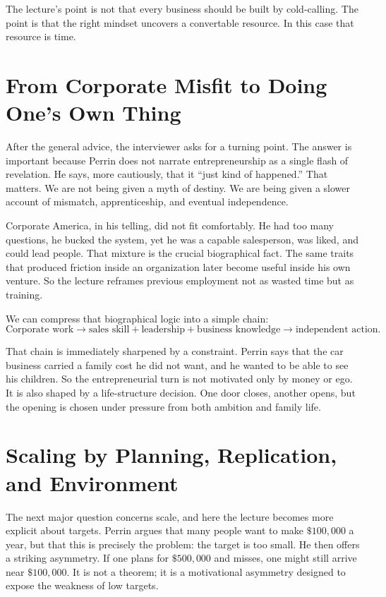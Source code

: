 The lecture's point is not that every business should be built by cold-calling. The point is that the right mindset uncovers a convertable resource. In this case that resource is time.

\section{From Corporate Misfit to Doing One's Own Thing}

After the general advice, the interviewer asks for a turning point. The answer is important because Perrin does not narrate entrepreneurship as a single flash of revelation. He says, more cautiously, that it ``just kind of happened.'' That matters. We are not being given a myth of destiny. We are being given a slower account of mismatch, apprenticeship, and eventual independence.

Corporate America, in his telling, did not fit comfortably. He had too many questions, he bucked the system, yet he was a capable salesperson, was liked, and could lead people. That mixture is the crucial biographical fact. The same traits that produced friction inside an organization later become useful inside his own venture. So the lecture reframes previous employment not as wasted time but as training.

We can compress that biographical logic into a simple chain:
\begin{equation}
\text{Corporate work} \to \text{sales skill} + \text{leadership} + \text{business knowledge} \to \text{independent action}.
\end{equation}

That chain is immediately sharpened by a constraint. Perrin says that the car business carried a family cost he did not want, and he wanted to be able to see his children. So the entrepreneurial turn is not motivated only by money or ego. It is also shaped by a life-structure decision. One door closes, another opens, but the opening is chosen under pressure from both ambition and family life.

\section{Scaling by Planning, Replication, and Environment}

The next major question concerns scale, and here the lecture becomes more explicit about targets. Perrin argues that many people want to make \(\$100{,}000\) a year, but that this is precisely the problem: the target is too small. He then offers a striking asymmetry. If one plans for \(\$500{,}000\) and misses, one might still arrive near \(\$100{,}000\). It is not a theorem; it is a motivational asymmetry designed to expose the weakness of low targets.

